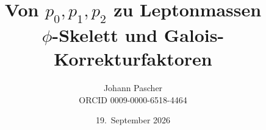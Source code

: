 \documentclass[11pt,a4paper]{report}
\title{Von $p_0,p_1,p_2$ zu Leptonmassen\\[0.5em]\large $\phi$-Skelett und Galois-Korrekturfaktoren}
\date{19.~September 2026}
\author{Johann Pascher\\\small ORCID 0009-0000-6518-4464}
\begin{document}
\renewcommand{\thechapter}{}
\renewcommand{\thesection}{\arabic{section}}
\maketitle
\tableofcontents

\end{document}

